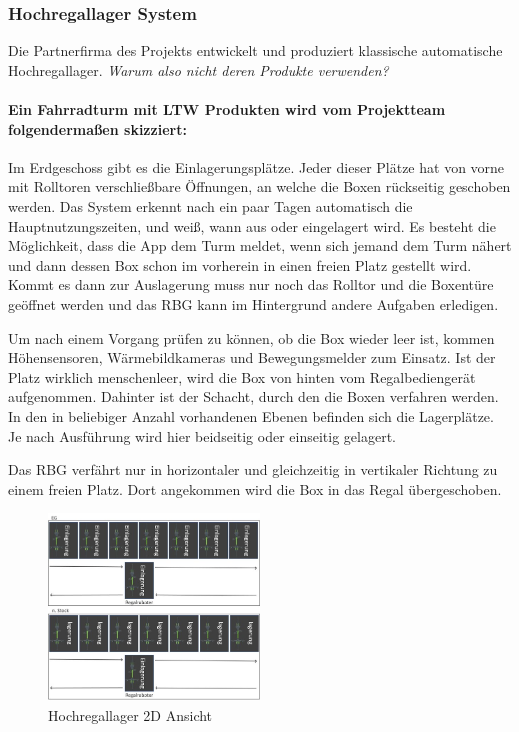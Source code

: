 \subsubsection{Hochregallager System}
Die Partnerfirma des Projekts entwickelt und produziert klassische automatische Hochregallager. \textit{Warum also nicht deren Produkte verwenden?}

\paragraph{Ein Fahrradturm mit LTW Produkten wird vom Projektteam folgendermaßen skizziert:}
Im Erdgeschoss gibt es die Einlagerungsplätze. Jeder dieser Plätze hat von vorne mit Rolltoren verschließbare Öffnungen, an welche die Boxen rückseitig geschoben werden. Das System erkennt nach ein paar Tagen automatisch die Hauptnutzungszeiten, und weiß, wann aus oder eingelagert wird. Es besteht die Möglichkeit, dass die App dem Turm meldet, wenn sich jemand dem Turm nähert und dann dessen Box schon im vorherein in einen freien Platz gestellt wird. Kommt es dann zur Auslagerung muss nur noch das Rolltor und die Boxentüre geöffnet werden und das \ac{RBG} kann im Hintergrund andere Aufgaben erledigen.

\noindent Um nach einem Vorgang prüfen zu können, ob die Box wieder leer ist, kommen Höhensensoren, Wärmebildkameras und Bewegungsmelder zum Einsatz. Ist der Platz wirklich menschenleer, wird die Box von hinten vom Regalbediengerät aufgenommen. Dahinter ist der Schacht, durch den die Boxen verfahren werden. In den in beliebiger Anzahl vorhandenen Ebenen befinden sich die Lagerplätze. Je nach Ausführung wird hier beidseitig oder einseitig gelagert.

\noindent Das \ac{RBG} verfährt nur in horizontaler und gleichzeitig in vertikaler Richtung zu einem freien Platz. Dort angekommen wird die Box in das Regal übergeschoben.

\begin{figure}[H]
    \centering
    \includegraphics[width=0.5\textwidth]{images/hochregallager2d.jpg}
    \caption{Hochregallager 2D Ansicht}
    \label{fig:hochregallager2d}
\end{figure}

